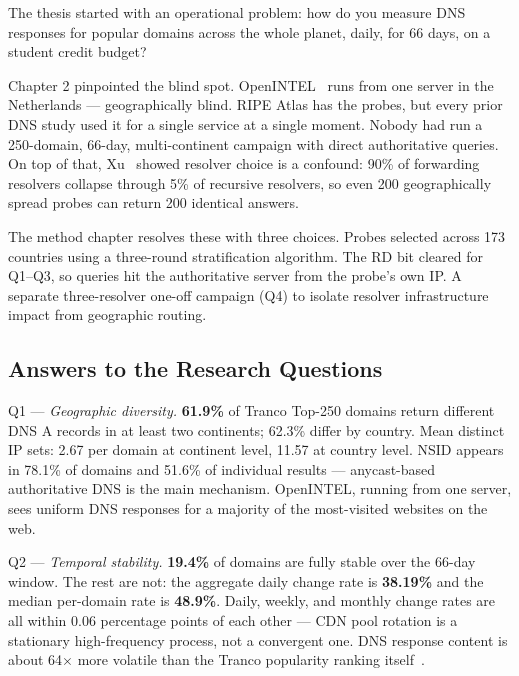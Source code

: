 The thesis started with an operational problem: how do you measure \ac{DNS} responses for popular domains across the whole planet, daily, for 66 days, on a student credit budget?

Chapter 2 pinpointed the blind spot. OpenINTEL~\cite{vanRijswijk2016} runs from one server in the Netherlands --- geographically blind. RIPE Atlas has the probes, but every prior \ac{DNS} study used it for a single service at a single moment. Nobody had run a 250-domain, 66-day, multi-continent campaign with direct authoritative queries. On top of that, Xu~\cite{Xu2023} showed resolver choice is a confound: 90\% of forwarding resolvers collapse through 5\% of recursive resolvers, so even 200 geographically spread probes can return 200 identical answers.

The method chapter resolves these with three choices. Probes selected across 173 countries using a three-round stratification algorithm. The RD bit cleared for Q1--Q3, so queries hit the authoritative server from the probe's own \ac{IP}. A separate three-resolver one-off campaign (Q4) to isolate resolver infrastructure impact from geographic routing.

\bigskip
\subsection{Answers to the Research Questions}
\label{subsec:5.5.2}

Q1 --- \textit{Geographic diversity.} \textbf{61.9\%} of Tranco Top-250 domains return different \ac{DNS} \ac{A} records in at least two continents; 62.3\% differ by country. Mean distinct \ac{IP} sets: 2.67 per domain at continent level, 11.57 at country level. \ac{NSID} appears in 78.1\% of domains and 51.6\% of individual results --- anycast-based authoritative \ac{DNS} is the main mechanism. OpenINTEL, running from one server, sees uniform \ac{DNS} responses for a majority of the most-visited websites on the web.

Q2 --- \textit{Temporal stability.} \textbf{19.4\%} of domains are fully stable over the 66-day window. The rest are not: the aggregate daily change rate is \textbf{38.19\%} and the median per-domain rate is \textbf{48.9\%}. Daily, weekly, and monthly change rates are all within 0.06 percentage points of each other --- \ac{CDN} pool rotation is a stationary high-frequency process, not a convergent one. \ac{DNS} response content is about 64$\times$ more volatile than the Tranco popularity ranking itself~\cite{LePochat2019}.

